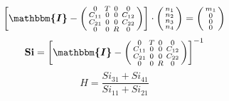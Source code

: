 \[ \left[ \boldsymbol{\mathbbm{I}}  - \left(\begin{smallmatrix} 0 & T
& 0 & 0 \\ C_{11} & 0 & 0 & C_{12} \\ C_{21} & 0 & 0 & C_{22} \\ 0 & 0
& R & 0 \end{smallmatrix}\right)\right] \cdot
\left(\begin{smallmatrix} n_{1} \\ n_{2} \\ n_{3} \\ n_{4}
\end{smallmatrix}\right) = \left(\begin{smallmatrix} m_{1} \\ 0 \\ 0
\\ 0 \end{smallmatrix}\right) \]
\[ \mathbf{Si} = \left[ \boldsymbol{\mathbbm{I}}  -
\left(\begin{smallmatrix} 0 & T & 0 & 0 \\ C_{11} & 0 & 0 & C_{12} \\
C_{21} & 0 & 0 & C_{22} \\ 0 & 0 & R & 0 \end{smallmatrix}\right)
\right]^{-1} \]
\[ H = \frac{ Si_{31} + Si_{41} }{ Si_{11} + Si_{21} }  \]
